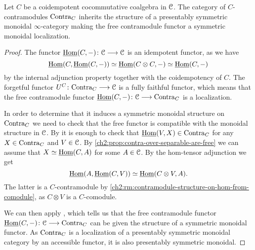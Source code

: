 \begin{lemma}
    \label{ch2:lm:free-contra-monoidal}
    Let $C$ be a coidempotent cocommutative coalgebra in $\EuScript{C}$. The category of $C$-contramodules $\mathrm{Contra}_C$ inherits the structure of a presentably symmetric monoidal $\infty$-category making the free contramodule functor a symmetric monoidal localization.
\end{lemma}
\begin{proof}
    The functor $\operatorname{\underline{Hom}}(C,-)\colon \EuScript{C} \longrightarrow \EuScript{C}$ is an idempotent functor, as we have
    \[\operatorname{\underline{Hom}}(C, \operatorname{\underline{Hom}}(C,-))\simeq \operatorname{\underline{Hom}}(C\otimes C, -)\simeq \operatorname{\underline{Hom}}(C,-)\]
    by the internal adjunction property together with the coidempotency of $C$. The forgetful functor $U^C\colon \mathrm{Contra}_C\longrightarrow \EuScript{C}$ is a fully faithful functor, which means that the free contramodule functor $\operatorname{\underline{Hom}}(C,-)\colon\EuScript{C}\longrightarrow \mathrm{Contra}_C$ is a localization. 
    
    In order to determine that it induces a symmetric monoidal structure on $\mathrm{Contra}_C$ we need to check that the free functor is compatible with the monoidal structure in $\EuScript{C}$. By \cite[2.12(3)]{nikolaus_2016} it is enough to check that $\operatorname{\underline{Hom}}(V,X)\in \mathrm{Contra}_C$ for any $X\in \mathrm{Contra}_C$ and $V\in \EuScript{C}$. By \cref{ch2:prop:contra-over-separable-are-free} we can assume that $X \simeq \operatorname{\underline{Hom}}(C, A)$ for some $A\in \EuScript{C}$. By the hom-tensor adjunction we get 
    \[\operatorname{\underline{Hom}}(A, \operatorname{\underline{Hom}}(C, V))\simeq \operatorname{\underline{Hom}}(C\otimes V, A).\]
    The latter is a $C$-contramodule by \cref{ch2:rm:contramodule-structure-on-hom-from-comodule}, as $C\otimes V$ is a $C$-comodule. 

    We can then apply \cite[2.2.1.9]{lurie_09}, which tells us that the free contramodule functor $\operatorname{\underline{Hom}}(C,-)\colon \EuScript{C}\longrightarrow \mathrm{Contra}_C$ can be given the structure of a symmetric monoidal functor. As $\mathrm{Contra}_C$ is a localization of a presentably symmetric monoidal category by an accessible functor, it is also presentably symmetric monoidal.  
\end{proof}





